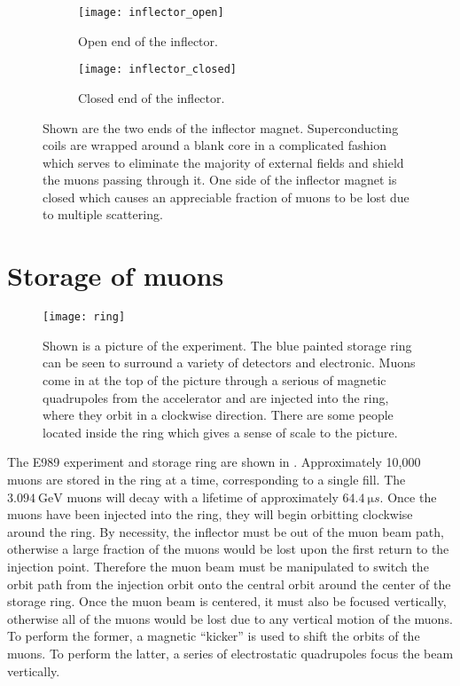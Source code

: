\begin{figure}[]
\centering
    \begin{subfigure}[]{0.46\textwidth}
        \centering
        \texttt{[image: inflector\_open]}
        \caption{Open end of the inflector.}
    \end{subfigure}%
    \hspace{1cm}
    \begin{subfigure}[]{0.45\textwidth}
        \centering
        \texttt{[image: inflector\_closed]}
        \caption{Closed end of the inflector.}
    \end{subfigure}
\caption[Superconducting Inflector magnet]{Shown are the two ends of the inflector magnet. Superconducting coils are wrapped around a blank core in a complicated fashion which serves to eliminate the majority of external fields and shield the muons passing through it. One side of the inflector magnet is closed which causes an appreciable fraction of muons to be lost due to multiple scattering.}
\label{fig:inflector}
\end{figure}


\section{Storage of muons}
\label{sec:Storage}

\begin{figure}[]
    \centering
    \texttt{[image: ring]}
    \caption[The \gmtwo experiment]{Shown is a picture of the \gmtwo experiment. The blue painted storage ring can be seen to surround a variety of detectors and electronic. Muons come in at the top of the picture through a serious of magnetic quadrupoles from the accelerator and are injected into the ring, where they orbit in a clockwise direction. There are some people located inside the ring which gives a sense of scale to the picture.}   
    \label{fig:ring}
\end{figure}


The E989 experiment and storage ring are shown in . Approximately 10,000 muons are stored in the \gmtwo ring at a time, corresponding to a single fill. The $\SI{3.094}{\GeV}$ muons will decay with a lifetime of approximately $\SI{64.4}{\micro s}$. Once the muons have been injected into the ring, they will begin orbitting clockwise around the ring. By necessity, the inflector must be out of the muon beam path, otherwise a large fraction of the muons would be lost upon the first return to the injection point. Therefore the muon beam must be manipulated to switch the orbit path from the injection orbit onto the central orbit around the center of the storage ring. Once the muon beam is centered, it must also be focused vertically, otherwise all of the muons would be lost due to any vertical motion of the muons. To perform the former, a magnetic ``kicker'' is used to shift the orbits of the muons. To perform the latter, a series of electrostatic quadrupoles focus the beam vertically.

